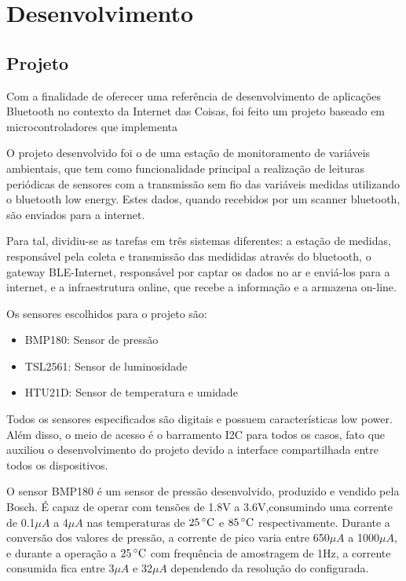 \section{Desenvolvimento}

\subsection{Projeto}
Com a finalidade de oferecer uma referência de desenvolvimento de aplicações
Bluetooth no contexto da Internet das Coisas, foi feito um projeto baseado em
microcontroladores que implementa 

O projeto desenvolvido foi o de uma estação de monitoramento de variáveis
ambientais, que tem como funcionalidade principal a realização de leituras
periódicas de sensores com a transmissão sem fio das variáveis medidas
utilizando o bluetooth low energy. Estes dados, quando recebidos por um scanner
bluetooth, são enviados para a internet.

Para tal, dividiu-se as tarefas em três sistemas diferentes: a estação de
medidas, responsável pela coleta e transmissão das medididas através do
bluetooth, o gateway BLE-Internet, responsável por captar os dados no ar e
enviá-los para a internet, e a infraestrutura online, que recebe a informação e
a armazena on-line.


Os sensores escolhidos para o projeto são:
\begin{itemize}
  \item BMP180: Sensor de pressão
  \item TSL2561: Sensor de luminosidade
  \item HTU21D: Sensor de temperatura e umidade
\end{itemize}

Todos os sensores especificados são digitais e possuem características low
power. Além disso, o meio de acesso é o barramento I2C para todos os casos, fato
que auxiliou o desenvolvimento do projeto devido a interface compartilhada entre
todos os dispositivos.

O sensor BMP180 é um sensor de pressão desenvolvido, produzido e vendido pela
Bosch. É capaz de operar com tensões de 1.8V a 3.6V,consumindo uma corrente de
0.1$\mu A$ a 4$\mu A$ nas temperaturas de $25\,^{\circ}{\rm C}$ e
$85\,^{\circ}{\rm C}$ respectivamente. Durante a conversão dos valores de
pressão, a corrente de pico varia entre 650$\mu A$ a 1000$\mu A$, e durante a
operação a $25\,^{\circ}{\rm C}$ com frequência de amostragem de 1Hz, a
corrente consumida fica entre 3$\mu A$ e 32$\mu A$ dependendo da resolução do
configurada. \cite{BMP180Datasheet}


